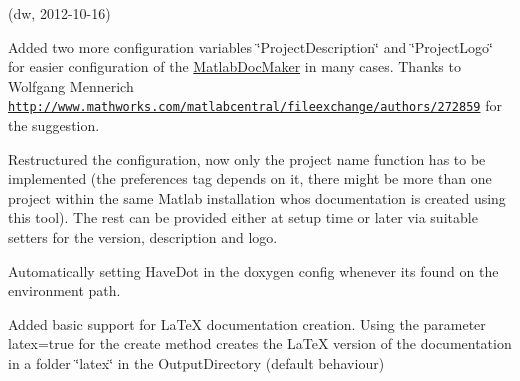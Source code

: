 
\begin{DoxyRefList}
\item[\label{newfeat1_4__newfeat1_4000001}%
\hypertarget{newfeat1_4__newfeat1_4000001}{}%
Class \hyperlink{class_matlab_doc_maker}{Matlab\+Doc\+Maker} ](dw, 2012-\/10-\/16)
\begin{DoxyItemize}
\item Added two more configuration variables \char`\"{}\+Project\+Description\char`\"{} and \char`\"{}\+Project\+Logo\char`\"{} for easier configuration of the \hyperlink{class_matlab_doc_maker}{Matlab\+Doc\+Maker} in many cases. Thanks to Wolfgang Mennerich \href{http://www.mathworks.com/matlabcentral/fileexchange/authors/272859}{\tt http\+://www.\+mathworks.\+com/matlabcentral/fileexchange/authors/272859} for the suggestion.
\item Restructured the configuration, now only the project name function has to be implemented (the preferences tag depends on it, there might be more than one project within the same Matlab installation whos documentation is created using this tool). The rest can be provided either at setup time or later via suitable setters for the version, description and logo.
\item Automatically setting Have\+Dot in the doxygen config whenever its found on the environment path.
\item Added basic support for La\+TeX documentation creation. Using the parameter {\ttfamily latex}=true for the create method creates the La\+TeX version of the documentation in a folder \char`\"{}latex\char`\"{} in the Output\+Directory (default behaviour)
\end{DoxyItemize}
\end{DoxyRefList}